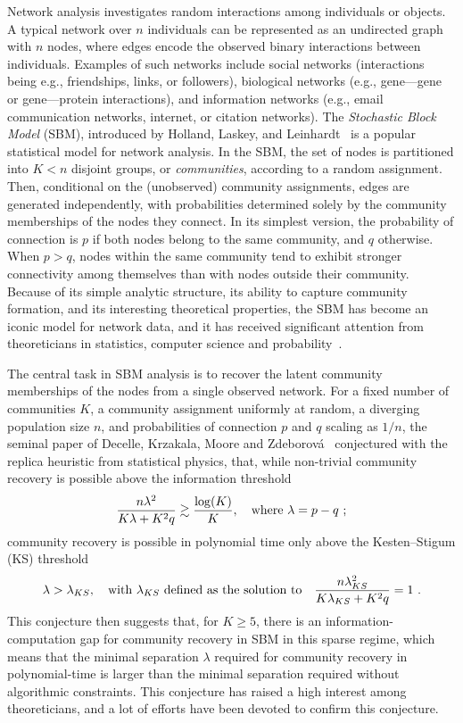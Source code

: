 \documentclass[final]{colt2026}
\newcommand{\1}{\mathbf{1}}
\begin{document}
Network analysis  investigates random interactions among individuals or objects.  A typical network over $n$ individuals can be represented as an undirected graph with $n$ nodes, where edges encode the observed binary interactions between individuals. 
Examples of such networks include social networks (interactions being e.g., friendships, links, or followers), 
biological networks (e.g., gene---gene or gene---protein interactions), 
and information networks (e.g., email communication networks, internet, or citation networks).
The \emph{Stochastic Block Model} (SBM), introduced by Holland, Laskey, and Leinhardt~\cite{holland1983stochastic} is a popular statistical model for network analysis. In the SBM, the set of nodes is partitioned into $K < n$ disjoint groups, or \emph{communities}, according to a random assignment. Then, 
conditional on the (unobserved) community assignments, edges are generated independently, 
with probabilities determined solely by the community memberships of the nodes they connect. 
In its simplest version, the probability of connection is $p$ if both nodes belong to the same community, and $q$ otherwise. When $p>q$, nodes within the same community tend to exhibit stronger connectivity among themselves than with nodes outside their community. 
Because of its simple analytic structure, its ability to capture community formation, and its interesting 
theoretical properties, the SBM has become an iconic model for network data, and it has received significant attention from theoreticians in statistics, computer science and probability~\cite{AbbeReview2018}. 

The central task in SBM analysis is to recover the latent community memberships of the nodes 
from a single observed network. For a fixed  number of communities $K$, a community assignment uniformly at random,  a diverging population size $n$, and probabilities of connection $p$ and $q$ scaling as $1/n$, the seminal paper of Decelle, Krzakala, Moore and Zdeborov\'a~\cite{Decelle2011} conjectured with the replica heuristic from statistical physics, that, while non-trivial community recovery is possible above the information threshold
\begin{equation}\label{eq:inform}
{n\lambda^2 \over K\lambda  + K^2q} \gtrsim {\log(K)\over K},\quad \text{where}\ \lambda=p-q\ ;
\end{equation}
community recovery is possible in polynomial time  only above the Kesten–Stigum (KS) threshold
\begin{equation}\label{eq:KS}
\lambda>\lambda_{KS},\quad \text{with $\lambda_{KS}$ defined as the solution to}\quad
{n\lambda_{KS}^2 \over K\lambda_{KS}  + K^2q} =1\ .
\end{equation}
This conjecture then suggests that, for $K\geq 5$, there is an information-computation gap for community recovery in SBM in this sparse regime, which means that the minimal separation $\lambda$ required for community recovery in polynomial-time is larger than the minimal separation required without algorithmic constraints. This conjecture has raised a high interest among theoreticians, and a lot of efforts have been devoted to confirm this conjecture.
\end{document}
